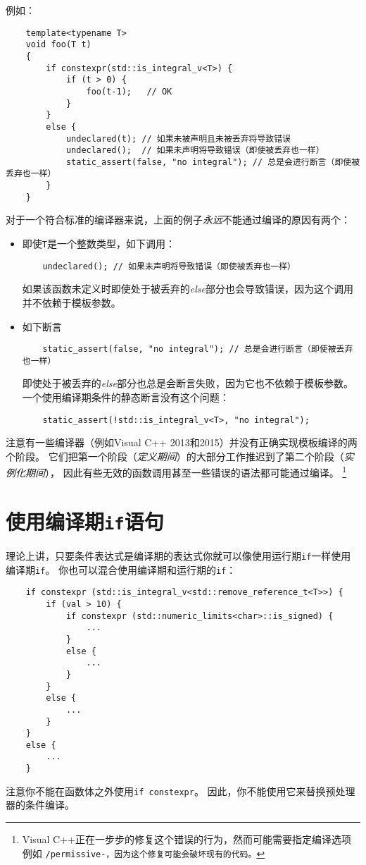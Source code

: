 例如：
\begin{lstlisting}
    template<typename T>
    void foo(T t)
    {
        if constexpr(std::is_integral_v<T>) {
            if (t > 0) {
                foo(t-1);   // OK
            }
        }
        else {
            undeclared(t); // 如果未被声明且未被丢弃将导致错误
            undeclared();  // 如果未声明将导致错误（即使被丢弃也一样）
            static_assert(false, "no integral"); // 总是会进行断言（即使被丢弃也一样）
        }
    }
\end{lstlisting}
对于一个符合标准的编译器来说，上面的例子\emph{永远}不能通过编译的原因有两个：
\begin{itemize}
    \item 即使\texttt{T}是一个整数类型，如下调用：
    \begin{lstlisting}
    undeclared(); // 如果未声明将导致错误（即使被丢弃也一样）
    \end{lstlisting}
    如果该函数未定义时即使处于被丢弃的\emph{else}部分也会导致错误，因为这个调用并不依赖于模板参数。
    \item 如下断言
    \begin{lstlisting}
    static_assert(false, "no integral"); // 总是会进行断言（即使被丢弃也一样）
    \end{lstlisting}
    即使处于被丢弃的\emph{else}部分也总是会断言失败，因为它也不依赖于模板参数。
    一个使用编译期条件的静态断言没有这个问题：
    \begin{lstlisting}
    static_assert(!std::is_integral_v<T>, "no integral");
    \end{lstlisting}
\end{itemize}
注意有一些编译器（例如Visual C++ 2013和2015）并没有正确实现模板编译的两个阶段。
它们把第一个阶段（\emph{定义期间}）的大部分工作推迟到了第二个阶段（\emph{实例化期间}），
因此有些无效的函数调用甚至一些错误的语法都可能通过编译。
\footnote{Visual C++正在一步步的修复这个错误的行为，然而可能需要指定编译选项例如
\texttt{/permissive-，因为这个修复可能会破坏现有的代码。}}

\section{使用编译期\texttt{if}语句}
理论上讲，只要条件表达式是编译期的表达式你就可以像使用运行期\texttt{if}一样使用编译期\texttt{if}。
你也可以混合使用编译期和运行期的\texttt{if}：
\begin{lstlisting}
    if constexpr (std::is_integral_v<std::remove_reference_t<T>>) {
        if (val > 10) {
            if constexpr (std::numeric_limits<char>::is_signed) {
                ...
            }
            else {
                ...
            }
        }
        else {
            ...
        }
    }
    else {
        ...
    }
\end{lstlisting}
注意你不能在函数体之外使用\texttt{if constexpr}。
因此，你不能使用它来替换预处理器的条件编译。

